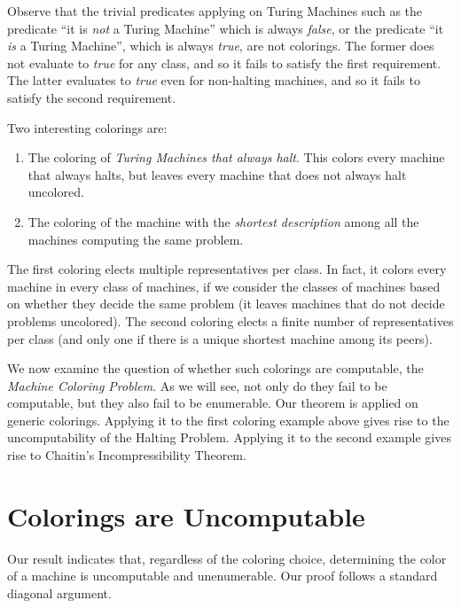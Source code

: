 \documentclass[runningheads]{format/llncs}
\begin{document}
Observe that the trivial predicates
applying on Turing Machines such as the predicate
``it is \emph{not} a Turing Machine'' which is always \emph{false}, or the
predicate ``it \emph{is} a Turing Machine'', which is always \emph{true},
are not colorings. The former does not evaluate to \emph{true}
for any class, and so it fails to satisfy the first requirement.
The latter evaluates to \emph{true} even
for non-halting machines, and so it fails to satisfy the
second requirement.

Two interesting colorings are:

\begin{enumerate}
    \item The coloring of \emph{Turing Machines that always halt}.
          This colors every machine that always halts, but
          leaves every machine that does not always halt uncolored.
    \item The coloring of the machine with the \emph{shortest description}
          among all the machines computing the same problem.
\end{enumerate}

The first coloring elects multiple representatives per class. In
fact, it colors every machine in every class of machines, if we
consider the classes of machines based on whether they decide
the same problem (it leaves machines that do not decide problems
uncolored). The second coloring
elects a finite number of representatives per class (and only one
if there is a unique shortest machine among its peers).

We now examine the question of whether such colorings are
computable, the \emph{Machine Coloring Problem}.
As we will see, not only do they fail to be computable,
but they also fail to be enumerable. Our theorem is applied on
generic colorings. Applying it to the first coloring example
above gives rise to the uncomputability
of the Halting Problem. Applying it to the second example
gives rise to Chaitin's Incompressibility Theorem.

\section{Colorings are Uncomputable}
Our result indicates that, regardless of the coloring choice,
determining the color of a machine is uncomputable and unenumerable.
Our proof follows a standard diagonal argument.
\end{document}
